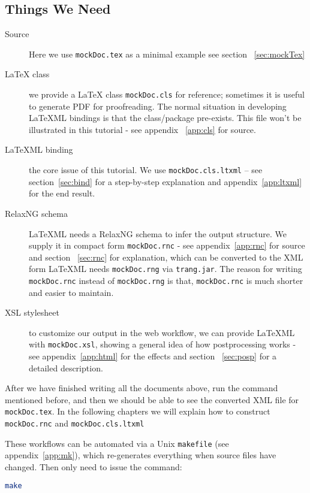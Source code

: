 \documentclass[a4paper]{article}
\def\latexml{{\LaTeX}ML\xspace}
\begin{document}
\subsection{Things We Need}
\begin{description}
\item[Source] Here we use \lstinline|mockDoc.tex| as a minimal example see section ~\ref{sec:mockTex} \item[{\LaTeX} class] we provide a {\LaTeX} class \lstinline|mockDoc.cls| for reference; sometimes it is useful to generate PDF for proofreading. The  normal situation in
  developing \latexml bindings is that the class/package pre-exists. This file won't be
  illustrated in this tutorial - see appendix ~\ref{app:cls} for source.
\item[\latexml binding] the core issue of this tutorial. We use \lstinline|mockDoc.cls.ltxml|
  -- see section~\ref{sec:bind} for a step-by-step explanation and appendix~\ref{app:ltxml}
  for the end result.
\item[RelaxNG schema] \latexml needs a RelaxNG schema to infer the output structure. We
  supply it in compact form \lstinline|mockDoc.rnc| - see appendix~\ref{app:rnc} for source and section ~\ref{sec:rnc} for explanation, which
  can be converted to the XML form \latexml needs \lstinline|mockDoc.rng| via
  \lstinline|trang.jar|.  The reason for writing \lstinline|mockDoc.rnc| instead of
  \lstinline|mockDoc.rng| is that, \lstinline|mockDoc.rnc| is much shorter and easier to
  maintain. 
\item[XSL stylesheet] to customize our output in the web workflow, we can provide \latexml with 
  \lstinline|mockDoc.xsl|, showing a general idea of how postprocessing works - see appendix~\ref{app:html}
  for the effects and section ~\ref{sec:posp} for a detailed description.
\end{description} 
After we have finished writing all the documents above, run the command mentioned before,
and then we should be able to see the converted XML file for \lstinline|mockDoc.tex|. In
the following chapters we will explain how to construct \lstinline|mockDoc.rnc| and
\lstinline|mockDoc.cls.ltxml|


These workflows can be automated via a Unix \lstinline|makefile| (see
appendix~\ref{app:mk}), which re-generates everything when source files have changed. Then
only need to issue the command:
\begin{lstlisting}[language=bash]
make
\end{lstlisting}
\end{document}
